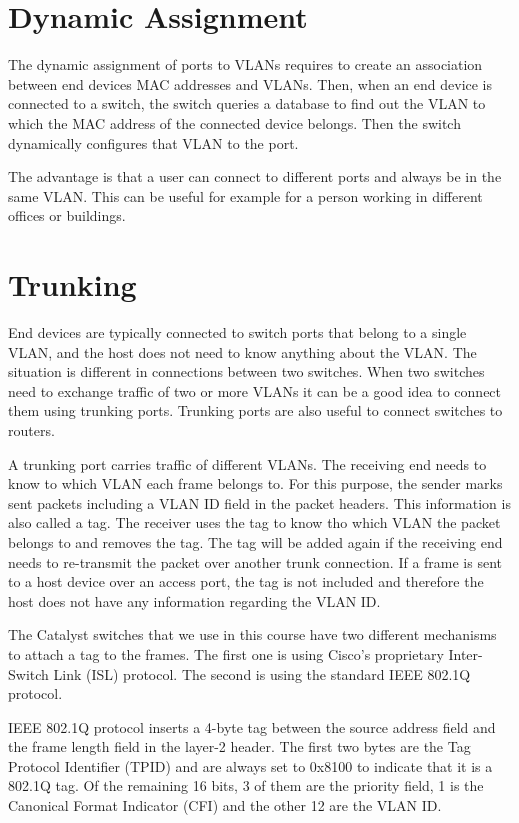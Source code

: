 \section{Dynamic Assignment}

The dynamic assignment of ports to VLANs requires to create an association between end devices MAC addresses and VLANs.
Then, when an end device is connected to a switch, the switch queries a database to find out the VLAN to which the MAC address of the connected device belongs.
Then the switch dynamically configures that VLAN to the port.

The advantage is that a user can connect to different ports and always be in the same VLAN.
This can be useful for example for a person working in different offices or buildings.

\section{Trunking}

End devices are typically connected to switch ports that belong to a single VLAN, and the host does not need to know anything about the VLAN.
The situation is different in connections between two switches.
When two switches need to exchange traffic of two or more VLANs it can be a good idea to connect them using trunking ports.
Trunking ports are also useful to connect switches to routers.

A trunking port carries traffic of different VLANs.
The receiving end needs to know to which VLAN each frame belongs to.
For this purpose, the sender marks sent packets including a VLAN ID field in the packet headers.
This information is also called a tag.
The receiver uses the tag to know tho which VLAN the packet belongs to and removes the tag.
The tag will be added again if the receiving end needs to re-transmit the packet over another trunk connection.
If a frame is sent to a host device over an access port, the tag is not included and therefore the host does not have any information regarding the VLAN ID.

The Catalyst switches that we use in this course have two different mechanisms to attach a tag to the frames.
The first one is using Cisco's proprietary Inter-Switch Link (ISL) protocol.
The second is using the standard IEEE 802.1Q protocol.

IEEE 802.1Q protocol inserts a 4-byte tag between the source address field and the frame length field in the layer-2 header.
The first two bytes are the Tag Protocol Identifier (TPID) and are always set to 0x8100 to indicate that it is a 802.1Q tag.
Of the remaining 16 bits, 3 of them are the priority field, 1 is the Canonical Format Indicator (CFI) and the other 12 are the VLAN ID.

